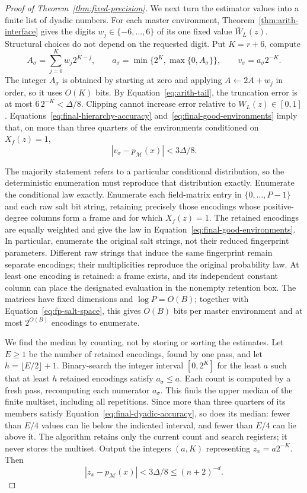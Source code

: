 \begin{proof}[Proof of Theorem~\ref{thm:fixed-precision}]
We next turn the estimator values into a finite list of dyadic numbers.
For each master environment, Theorem~\ref{thm:arith-interface}
gives the digits $w_j\in\{-6,\ldots,6\}$ of its one fixed value
$\bar W_L(z)$. Structural choices do not depend on the requested
digit. Put $K=r+6$, compute
\[
 A_\sigma=\sum_{j=0}^{K}w_j2^{K-j},\qquad
 a_\sigma=\min\{2^K,\max\{0,A_\sigma\}\},\qquad
 v_\sigma=a_\sigma2^{-K}.
\]
The integer $A_\sigma$ is obtained by starting at zero and applying
$A\leftarrow2A+w_j$ in order, so it uses $O(K)$ bits.
By Equation~\eqref{eq:arith-tail}, the truncation error is at most
$6\,2^{-K}<\Delta/8$. Clipping cannot increase error relative to
$W_L(z)\in[0,1]$. Equations~\eqref{eq:final-hierarchy-accuracy}
and~\eqref{eq:final-good-environments} imply that, on more than
three quarters of the environments conditioned on $X_f(z)=1$,
\begin{equation}\label{eq:final-dyadic-accuracy}
 |v_\sigma-p_{\mathcal M}(x)|<3\Delta/8.
\end{equation}

The majority statement refers to a particular conditional distribution, so the deterministic enumeration must reproduce that distribution exactly. Enumerate the conditional law exactly. Enumerate each field-matrix
entry in $\{0,\ldots,P-1\}$ and each raw salt bit string, retaining
precisely those encodings whose positive-degree columns form a frame
and for which $X_f(z)=1$. The retained encodings are equally weighted
and give the law in Equation~\eqref{eq:final-good-environments}.
In particular, enumerate the original salt strings, not their reduced
fingerprint parameters. Different raw strings that induce the same
fingerprint remain separate encodings; their multiplicities reproduce
the original probability law. At least one encoding is retained: a frame
exists, and its independent constant column can place the designated
evaluation in the nonempty retention box. The matrices have fixed
dimensions and $\log P=O(B)$; together with
Equation~\eqref{eq:fp-salt-space}, this gives $O(B)$ bits per master
environment and at most $2^{O(B)}$ encodings to enumerate.

We find the median by counting, not by storing or sorting the estimates. Let $E\ge1$ be the number of retained encodings, found by one pass,
and let $h=\lfloor E/2\rfloor+1$. Binary-search the integer interval
$[0,2^K]$ for the least $a$ such that at least $h$ retained encodings
satisfy $a_\sigma\le a$. Each count is computed by a fresh pass,
recomputing each numerator $a_\sigma$. This finds the upper median
of the finite multiset, including all repetitions. Since more than
three quarters of its members satisfy
Equation~\eqref{eq:final-dyadic-accuracy}, so does its median: fewer than
$E/4$ values can lie below the indicated interval, and fewer than
$E/4$ can lie above it. The algorithm retains only the current count
and search registers; it never stores the multiset.
Output the integers $(a,K)$ representing $z_x=a2^{-K}$. Then
\[
 |z_x-p_{\mathcal M}(x)|<3\Delta/8
       \le(n+2)^{-d}.
\]


\end{proof}
